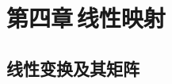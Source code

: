 \documentclass[11pt]{article}
\begin{document}

\addtocounter{section}{3}
\section{第四章\,线性映射}

\addtocounter{subsection}{3}
\subsection{线性变换及其矩阵}
\end{document}
